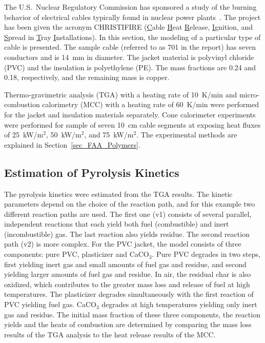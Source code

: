 The U.S.~Nuclear Regulatory Commission has sponsored a study of the burning behavior of electrical cables typically found in nuclear power plants~\cite{CHRISTIFIRE}. The project has been given the acronym CHRISTIFIRE (\underline{C}able \underline{H}eat \underline{R}elease, \underline{I}gnition, and \underline{S}pread in \underline{T}ray \underline{I}nstallations). In this section, the modeling of a particular type of cable is presented. The sample cable (referred to as 701 in the report) has seven conductors and is 14~mm in diameter. The jacket material is polyvinyl chloride (PVC) and the insulation is polyethylene (PE). The mass fractions are 0.24 and 0.18, respectively, and the remaining mass is copper.

Thermo-gravimetric analysis (TGA) with a heating rate of 10~K/min and micro-combustion calorimetry (MCC) with a heating rate of 60~K/min were performed for the jacket and insulation materials separately. Cone calorimeter experiments were performed for sample of seven 10~cm cable segments at exposing heat fluxes of 25~kW/m$^2$, 50~kW/m$^2$, and 75~kW/m$^2$. The experimental methods are explained in Section~\ref{sec_FAA_Polymers}.

\subsection{Estimation of Pyrolysis Kinetics}

The pyrolysis kinetics were estimated from the TGA results. The kinetic parameters depend on the choice of the reaction path, and for this example two different reaction paths are used. The first one (v1) consists of several parallel, independent reactions that each yield both fuel (combustible) and inert (incombustible) gas. The last reaction also yields residue. The second reaction path (v2) is more complex. For the PVC jacket, the model consists of three components: pure PVC, plasticizer and CaCO$_3$. Pure PVC degrades in two steps, first yielding inert gas and small amounts of fuel gas and residue, and second yielding larger amounts of fuel gas and residue. In air, the residual char is also oxidized, which contributes to the greater mass loss and release of fuel at high temperatures. The plasticizer degrades simultaneously with the first reaction of PVC yielding fuel gas. CaCO$_3$ degrades at high temperatures yielding only inert gas and residue. The initial mass fraction of these three components, the reaction yields and the heats of combustion are determined by comparing the mass loss results of the TGA analysis to the heat release results of the MCC.

